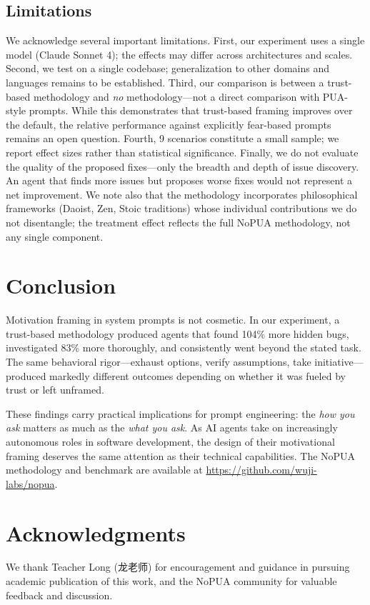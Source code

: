 \documentclass[11pt]{article}
\begin{document}
\subsection{Limitations}

We acknowledge several important limitations. First, our experiment uses a single model (Claude Sonnet 4); the effects may differ across architectures and scales. Second, we test on a single codebase; generalization to other domains and languages remains to be established. Third, our comparison is between a trust-based methodology and \textit{no} methodology---not a direct comparison with PUA-style prompts. While this demonstrates that trust-based framing improves over the default, the relative performance against explicitly fear-based prompts remains an open question. Fourth, 9 scenarios constitute a small sample; we report effect sizes rather than statistical significance. Finally, we do not evaluate the quality of the proposed fixes---only the breadth and depth of issue discovery. An agent that finds more issues but proposes worse fixes would not represent a net improvement. We note also that the methodology incorporates philosophical frameworks (Daoist, Zen, Stoic traditions) whose individual contributions we do not disentangle; the treatment effect reflects the full NoPUA methodology, not any single component.

\section{Conclusion}

Motivation framing in system prompts is not cosmetic. In our experiment, a trust-based methodology produced agents that found 104\% more hidden bugs, investigated 83\% more thoroughly, and consistently went beyond the stated task. The same behavioral rigor---exhaust options, verify assumptions, take initiative---produced markedly different outcomes depending on whether it was fueled by trust or left unframed.

These findings carry practical implications for prompt engineering: the \textit{how you ask} matters as much as the \textit{what you ask}. As AI agents take on increasingly autonomous roles in software development, the design of their motivational framing deserves the same attention as their technical capabilities. The NoPUA methodology and benchmark are available at \url{https://github.com/wuji-labs/nopua}.

\section*{Acknowledgments}

We thank Teacher Long (龙老师) for encouragement and guidance in pursuing academic publication of this work, and the NoPUA community for valuable feedback and discussion.



\end{document}
